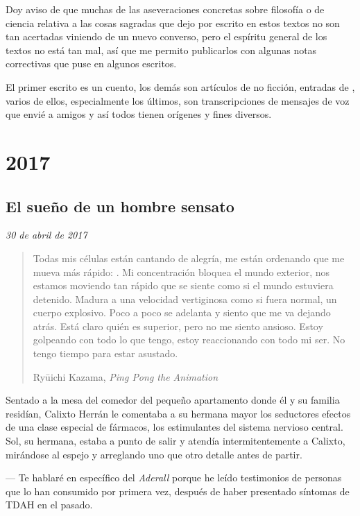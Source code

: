 \documentclass[12pt]{article}
\begin{document}
	Doy aviso de que muchas de las aseveraciones concretas sobre filosofía o
	de ciencia relativa a las cosas sagradas que dejo por escrito en estos
	textos no son tan acertadas viniendo de un nuevo converso, pero el
	espíritu general de los textos no está tan mal, así que me permito
	publicarlos con algunas notas correctivas que puse en algunos
	escritos.\newline

	El primer escrito es un cuento, los demás son artículos de no ficción,
	entradas de , varios de ellos, especialmente los
	últimos, son transcripciones de mensajes de voz que envié a amigos y así
	todos tienen orígenes y fines diversos.

	\newpage

	\section{2017}

	\subsection{El sueño de un hombre sensato}

	\textit{30 de abril de 2017}

	\blockquote[Ryūichi Kazama, \textit{Ping Pong the Animation}]
	{
		Todas mis células están cantando de alegría, me están ordenando
		que me mueva más rápido: .
		Mi concentración bloquea el mundo exterior, nos estamos moviendo
		tan rápido que se siente como si el mundo estuviera detenido.
		Madura a una velocidad vertiginosa como si fuera normal, un
		cuerpo explosivo. Poco a poco se adelanta y siento
		que me va dejando atrás. Está claro quién es superior, pero no
		me siento ansioso. Estoy golpeando con todo lo que tengo, estoy
		reaccionando con todo mi ser. No tengo tiempo para estar
		asustado.
	}

	Sentado a la mesa del comedor del pequeño apartamento donde él y su
	familia residían, Calixto Herrán le comentaba a su hermana mayor los
	seductores efectos de una clase especial de fármacos, los
	estimulantes del sistema nervioso central. Sol, su hermana, estaba
	a punto de salir y atendía intermitentemente a Calixto, mirándose
	al espejo y arreglando uno que otro detalle antes de partir.

	--- Te hablaré en específico del \textit{Aderall} porque he leído
	testimonios de personas que lo han consumido por primera vez, después de
	haber presentado síntomas de TDAH en el pasado.
\end{document}
